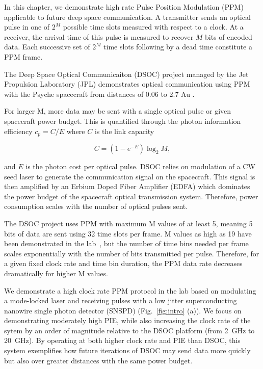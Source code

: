 \documentclass[11pt]{caltech_thesis} %
\begin{document}
In this chapter, we demonstrate high rate Pulse Position Modulation (PPM) applicable to future deep space communication. A transmitter sends an optical pulse in one of $2^M$ possible time slots measured with respect to a clock. At a receiver, the arrival time of this pulse is measured to recover $M$ bits of encoded data. Each successive set of $2^M$ time slots following by a dead time constitute a PPM frame.

The Deep Space Optical Communicaiton (DSOC) project managed by the Jet Propulsion Laboratory (JPL) demonstrates optical communication using PPM with the Psyche spacecraft from distances of 0.06 to 2.7 Au \autocite{Srinivasan2023GroundReceiver}.

For larger M, more data may be sent with a single optical pulse or given spacecraft power budget. This is quantified through the photon information efficiency $c_p = C/E$ where $C$ is the link capacity

$$
C=\left(1-e^{-E}\right) \log _2 M,
$$

and $E$ is the photon cost per optical pulse. DSOC relies on modulation of a CW seed laser to generate the communication signal on the spacecraft. This signal is then amplified by an Erbium Doped Fiber Amplifier (EDFA) which dominates the power budget of the spacecraft optical transmission system. Therefore, power consumption scales with the number of optical pulses sent.

The DSOC project uses PPM with maximum M values of at least 5, meaning 5 bits of data are sent using 32 time slots per frame. M values as high as 19 have been demonstrated in the lab~\autocite{essiambre2023record}, but the number of time bins needed per frame scales exponentially with the number of bits transmitted per pulse. Therefore, for a given fixed clock rate and time bin duration, the PPM data rate decreases dramatically for higher M values.

We demonstrate a high clock rate PPM protocol in the lab based on modulating a mode-locked laser and receiving pulses with a low jitter superconducting nanowire single photon detector (SNSPD) (Fig.~\ref{fig:intro} (a)). We focus on demonstrating moderately high PIE, while also increasing the clock rate of the sytem by an order of magnitude relative to the DSOC platform (from 2~GHz to 20~GHz). By operating at both higher clock rate and PIE than DSOC, this system exemplifies how future iterations of DSOC may send data more quickly but also over greater distances with the same power budget.
\end{document}
